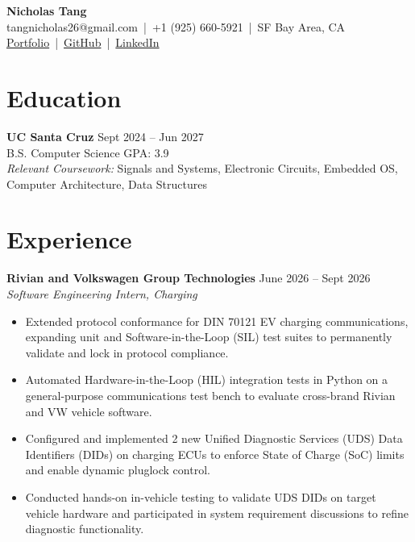 \documentclass[letterpaper,10pt]{article}
\begin{document}

\begin{center}
    {\LARGE \textbf{Nicholas Tang}} \\ [0.4em]
    tangnicholas26@gmail.com \,|\, +1 (925) 660-5921 \,|\, SF Bay Area, CA \\ [0.2em]
    \href{https://nicholas-tangerine.github.io}{Portfolio} \,|\, 
    \href{https://github.com/nicholas-tangerine}{GitHub} \,|\, 
    \href{https://linkedin.com/in/nicholas-tangerine}{LinkedIn}
\end{center}

\section*{Education}
\textbf{UC Santa Cruz} \hfill Sept 2024 -- Jun 2027 \\
B.S. Computer Science \hfill GPA: 3.9 \\
\textit{Relevant Coursework:} Signals and Systems, Electronic Circuits, Embedded OS, Computer Architecture, Data Structures

\section*{Experience}
\textbf{Rivian and Volkswagen Group Technologies} \hfill June 2026 -- Sept 2026 \\
\textit{Software Engineering Intern, Charging}
\begin{itemize}
    \item Extended protocol conformance for DIN 70121 EV charging communications, expanding unit and Software-in-the-Loop (SIL) test suites to permanently validate and lock in protocol compliance.
    \item Automated Hardware-in-the-Loop (HIL) integration tests in Python on a general-purpose communications test bench to evaluate cross-brand Rivian and VW vehicle software.
    \item Configured and implemented 2 new Unified Diagnostic Services (UDS) Data Identifiers (DIDs) on charging ECUs to enforce State of Charge (SoC) limits and enable dynamic pluglock control.
    \item Conducted hands-on in-vehicle testing to validate UDS DIDs on target vehicle hardware and participated in system requirement discussions to refine diagnostic functionality.
\end{itemize}
\end{document}
